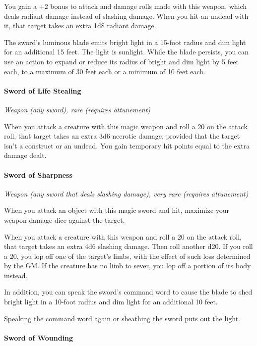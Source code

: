 \documentclass[
]{article}
\begin{document}
You gain a +2 bonus to attack and damage rolls made with this weapon,
which deals radiant damage instead of slashing damage. When you hit an
undead with it, that target takes an extra 1d8 radiant damage.

The sword's luminous blade emits bright light in a 15-foot radius and
dim light for an additional 15 feet. The light is sunlight. While the
blade persists, you can use an action to expand or reduce its radius of
bright and dim light by 5 feet each, to a maximum of 30 feet each or a
minimum of 10 feet each.

\hypertarget{sword-of-life-stealing}{%
\paragraph{Sword of Life Stealing}\label{sword-of-life-stealing}}

\emph{Weapon (any sword), rare (requires attunement)}

When you attack a creature with this magic weapon and roll a 20 on the
attack roll, that target takes an extra 3d6 necrotic damage, provided
that the target isn't a construct or an undead. You gain temporary hit
points equal to the extra damage dealt.

\hypertarget{sword-of-sharpness}{%
\paragraph{Sword of Sharpness}\label{sword-of-sharpness}}

\emph{Weapon (any sword that deals slashing damage), very rare (requires
attunement)}

When you attack an object with this magic sword and hit, maximize your
weapon damage dice against the target.

When you attack a creature with this weapon and roll a 20 on the attack
roll, that target takes an extra 4d6 slashing damage. Then roll another
d20. If you roll a 20, you lop off one of the target's limbs, with the
effect of such loss determined by the GM. If the creature has no limb to
sever, you lop off a portion of its body instead.

In addition, you can speak the sword's command word to cause the blade
to shed bright light in a 10-foot radius and dim light for an additional
10 feet.

Speaking the command word again or sheathing the sword puts out the
light.

\hypertarget{sword-of-wounding}{%
\paragraph{Sword of Wounding}\label{sword-of-wounding}}
\end{document}
